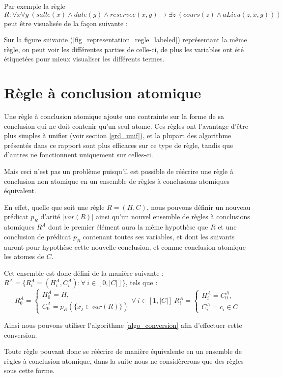 Par exemple la règle 
$R : \forall x \forall y\ (salle(x) \wedge date(y) \wedge reservee(x,y) 
\rightarrow \exists z\ (cours(z) \wedge aLieu(z,x,y)))$ 
peut être visualisée de la façon suivante :


Sur la figure suivante (\ref{fig_representation_regle_labeled})
représentant la même règle, on peut voir les différentes parties
de celle-ci, de plus les variables ont été étiquetées pour mieux visualiser les
différents termes.




\section{Règle à conclusion atomique}\label{def_regle_atomique}
Une règle à conclusion atomique ajoute une contrainte sur la forme de sa conclusion qui
ne doit contenir qu'un seul atome.
Ces règles ont l'avantage d'être plus simples à unifier (voir section \ref{grd_unif}), et
la plupart des algorithme présentés dans ce rapport sont plus efficaces sur ce type de
règle, tandis que d'autres ne fonctionnent uniquement sur celles-ci.

Mais ceci n'est pas un problème puisqu'il est possible de réécrire une règle à
conclusion non atomique en un ensemble de règles à conclusions atomiques équivalent.

En effet, quelle que soit une règle $R = (H,C)$, nous pouvons définir un nouveau prédicat
$p_R$ d'arité $|var(R)|$ ainsi qu'un nouvel ensemble de règles à conclusions atomiques 
$R^{A}$ dont le premier
élément aura la même hypothèse que $R$ et une conclusion de prédicat $p_R$ contenant 
toutes ses variables, et dont les suivants auront pour hypothèse cette nouvelle
conclusion, et comme conclusion atomique les atomes de $C$.

Cet ensemble est donc défini de la manière suivante :\\
$R^{A} =\{R^{A}_i = (H^{A}_i,C^{A}_i) : \forall\ i \in [0,|C|]\}$, tels que :\\
$$
	R^{A}_0 =
	\begin{cases}
		H^{A}_0 = H,\\
		C^{A}_0 = p_R(\{x_j \in var(R)\})
	\end{cases}
	\forall\ i \in [1,|C|]\ R^{A}_i =
	\begin{cases}
		H^{A}_i = C^{A}_0,\\
		C^{A}_i = c_i \in C
	\end{cases}
$$

Ainsi nous pouvons utiliser l'algorithme \ref{algo_conversion} afin d'effectuer cette
conversion.

Toute règle pouvant donc se réécrire de manière 
équivalente en un ensemble de
règles à conclusion atomique, dans la suite nous ne considèrerons que des règles sous cette 
forme.




